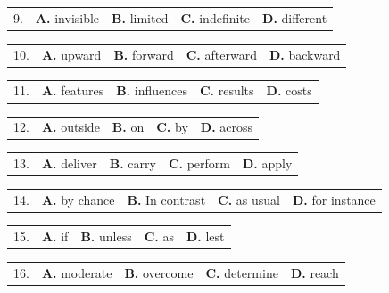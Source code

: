 \documentclass[UTF8,11pt]{ctexart}
\begin{document}
\noindent\begin{tabularx}{\linewidth}{@{}lXXXX@{}}9. & \textbf{A.} invisible & \textbf{B.} limited & \textbf{C.} indefinite & \textbf{D.} different\\\end{tabularx}\par

\noindent\begin{tabularx}{\linewidth}{@{}lXXXX@{}}10. & \textbf{A.} upward & \textbf{B.} forward & \textbf{C.} afterward & \textbf{D.} backward\\\end{tabularx}\par

\noindent\begin{tabularx}{\linewidth}{@{}lXXXX@{}}11. & \textbf{A.} features & \textbf{B.} influences & \textbf{C.} results & \textbf{D.} costs\\\end{tabularx}\par

\noindent\begin{tabularx}{\linewidth}{@{}lXXXX@{}}12. & \textbf{A.} outside & \textbf{B.} on & \textbf{C.} by & \textbf{D.} across\\\end{tabularx}\par

\noindent\begin{tabularx}{\linewidth}{@{}lXXXX@{}}13. & \textbf{A.} deliver & \textbf{B.} carry & \textbf{C.} perform & \textbf{D.} apply\\\end{tabularx}\par

\noindent\begin{tabularx}{\linewidth}{@{}lXXXX@{}}14. & \textbf{A.} by chance & \textbf{B.} In contrast & \textbf{C.} as usual & \textbf{D.} for instance\\\end{tabularx}\par

\noindent\begin{tabularx}{\linewidth}{@{}lXXXX@{}}15. & \textbf{A.} if & \textbf{B.} unless & \textbf{C.} as & \textbf{D.} lest\\\end{tabularx}\par

\noindent\begin{tabularx}{\linewidth}{@{}lXXXX@{}}16. & \textbf{A.} moderate & \textbf{B.} overcome & \textbf{C.} determine & \textbf{D.} reach\\\end{tabularx}\par
\end{document}

